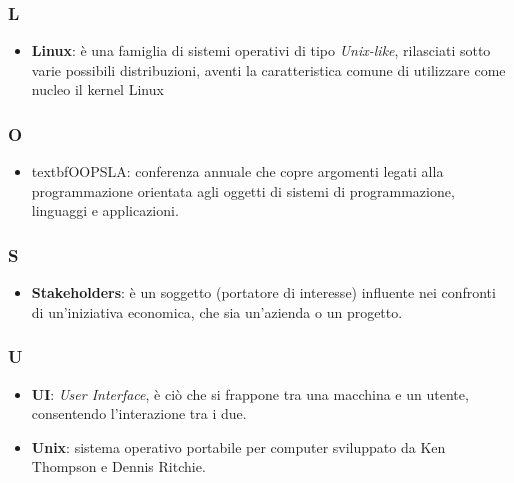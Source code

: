 \subsubsection{L}
\begin{itemize}
	\item \textbf{Linux}: è una famiglia di sistemi operativi di tipo \textit{Unix-like}, rilasciati sotto varie possibili distribuzioni, aventi la caratteristica comune di utilizzare come nucleo il kernel Linux
\end{itemize}

\subsubsection{O}
\begin{itemize}
	\item textbf{OOPSLA}: conferenza annuale che copre argomenti legati alla programmazione orientata agli oggetti di sistemi di programmazione, linguaggi e applicazioni.
\end{itemize}

\subsubsection{S}
\begin{itemize}
	\item \textbf{Stakeholders}: è un soggetto (portatore di interesse) influente nei confronti di un'iniziativa economica, che sia un'azienda o un progetto.
\end{itemize}

\subsubsection{U}
\begin{itemize}
	\item \textbf{UI}: \textit{User Interface}, è ciò che si frappone tra una macchina e un utente, consentendo l'interazione tra i due.
	\item \textbf{Unix}: sistema operativo portabile per computer sviluppato da Ken Thompson e Dennis Ritchie.
\end{itemize}

